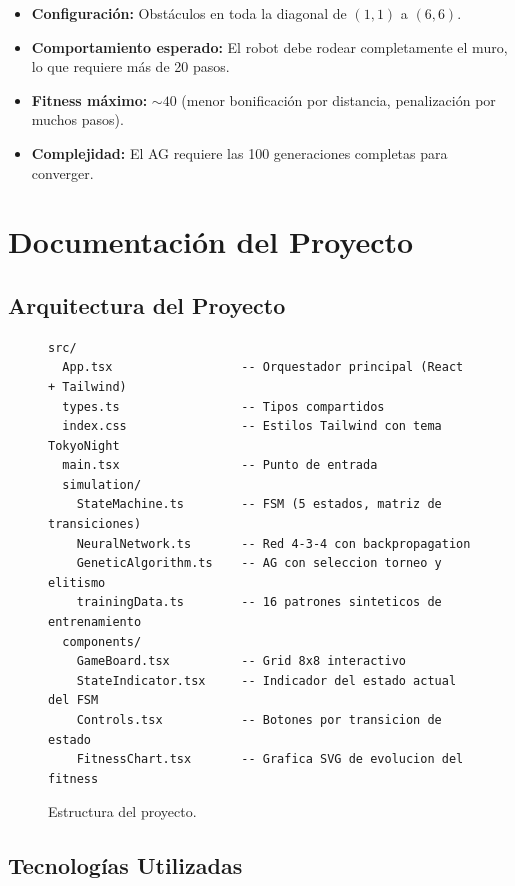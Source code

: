 \documentclass[12pt,a4paper]{article}
\begin{document}
\begin{itemize}
  \item \textbf{Configuraci\'on:} Obst\'aculos en toda la diagonal de $(1,1)$ a $(6,6)$.
  \item \textbf{Comportamiento esperado:} El robot debe rodear completamente el muro, lo que requiere m\'as de 20 pasos.
  \item \textbf{Fitness m\'aximo:} $\sim 40$ (menor bonificaci\'on por distancia, penalizaci\'on por muchos pasos).
  \item \textbf{Complejidad:} El AG requiere las 100 generaciones completas para converger.
\end{itemize}

\section{Documentaci\'on del Proyecto}

\subsection{Arquitectura del Proyecto}

\begin{figure}[H]
\centering
\begin{lstlisting}[style=estructura]
src/
  App.tsx                  -- Orquestador principal (React + Tailwind)
  types.ts                 -- Tipos compartidos
  index.css                -- Estilos Tailwind con tema TokyoNight
  main.tsx                 -- Punto de entrada
  simulation/
    StateMachine.ts        -- FSM (5 estados, matriz de transiciones)
    NeuralNetwork.ts       -- Red 4-3-4 con backpropagation
    GeneticAlgorithm.ts    -- AG con seleccion torneo y elitismo
    trainingData.ts        -- 16 patrones sinteticos de entrenamiento
  components/
    GameBoard.tsx          -- Grid 8x8 interactivo
    StateIndicator.tsx     -- Indicador del estado actual del FSM
    Controls.tsx           -- Botones por transicion de estado
    FitnessChart.tsx       -- Grafica SVG de evolucion del fitness
\end{lstlisting}
\caption{Estructura del proyecto.}
\label{fig:estructura}
\end{figure}

\subsection{Tecnolog\'ias Utilizadas}
\end{document}
